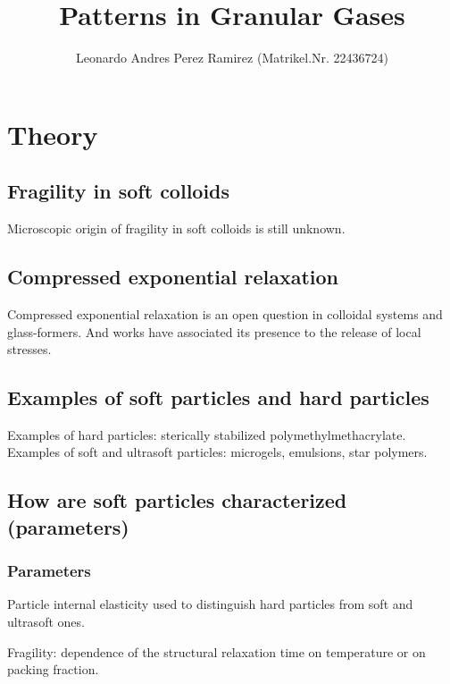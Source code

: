 \documentclass[11pt]{article}
\begin{document}
\title{Patterns in Granular Gases}
	
\author{Leonardo Andres Perez Ramirez (Matrikel.Nr. 22436724)}
\maketitle

\tableofcontents

\newpage
	
\section{Theory}

\subsection{Fragility in soft colloids}
Microscopic origin of fragility in soft colloids is still unknown.\autocite{Gnan.2019}



\subsection{Compressed exponential relaxation}
Compressed exponential relaxation is an open question in colloidal systems and glass-formers.\autocite{Gnan.2019} And works have associated its presence to the release of local stresses.


\subsection{Examples of soft particles and hard particles}
Examples of hard particles: sterically stabilized polymethylmethacrylate.\autocite{Gnan.2019} 
Examples of soft and ultrasoft particles: microgels, emulsions, star polymers.\autocite{Gnan.2019}

\subsection{How are soft particles characterized (parameters)}
\subsubsection{Parameters}
Particle internal elasticity used to distinguish hard particles from soft and ultrasoft ones.\autocite{Gnan.2019}

Fragility: dependence of the structural relaxation time on temperature or on packing fraction.\autocite{Gnan.2019}
\end{document}
